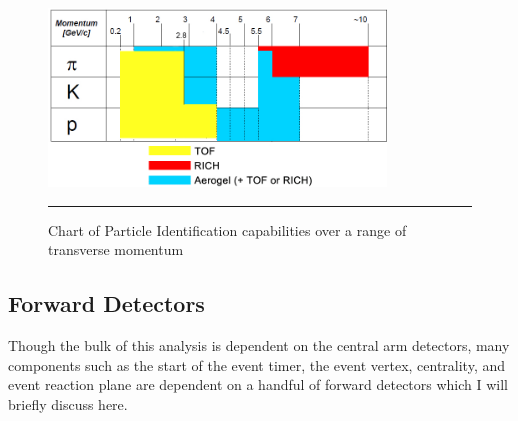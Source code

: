 \begin{figure}[h!]
  \centering
    \includegraphics[width=0.8\textwidth]{Figures/accrange.jpg}
    \rule{35em}{0.5pt}
  \caption[Chart of Particle Identification capabilities over a range of transverse momentum]{Chart of Particle Identification capabilities over a range of transverse momentum}
  \label{fig:PIDrange}
\end{figure}


\subsection{Forward Detectors}
Though the bulk of this analysis is dependent on the central arm detectors, many components such as the start of the event timer, the event vertex, centrality, and event reaction plane are dependent on a handful of forward detectors which I will briefly discuss here.

